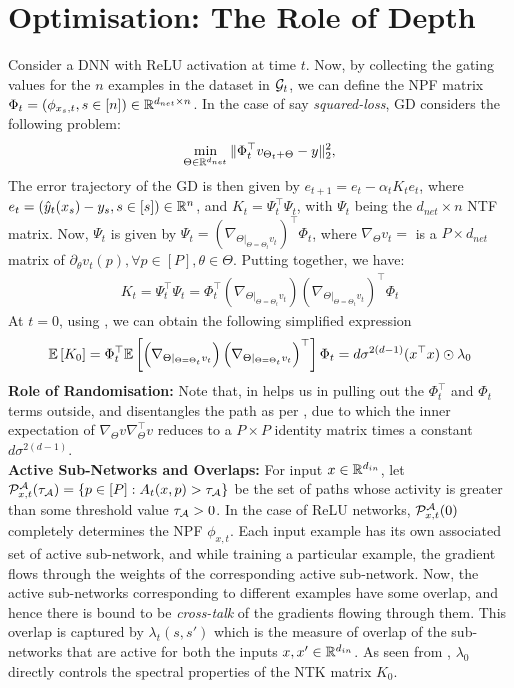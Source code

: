 \section{Optimisation: The Role of Depth}\label{sec:optimisation}
Consider a DNN with ReLU activation at time $t$. Now, by collecting the gating values for the $n$ examples in the dataset in $\mathcal{G}_t$, we can define the NPF matrix $\Phi_t=(\phi_{x_s,t},s\in[n] )\in \mathbb{R}^{d_{net}\times n}$. In the case of say \emph{squared-loss}, GD considers the following problem:
\begin{align}
\min_{\Theta\in\mathbb{R}^{d_{net}}}\|\Phi^\top_tv_{\Theta_t+\Theta}-y\|_2^2,
\end{align}
The error trajectory of the GD is then given by $e_{t+1}=e_t-\alpha_t K_te_t$, where $e_t=(\hat{y}_t(x_s)-y_s,s\in[s])\in\mathbb{R}^n$, and $K_t=\Psi^\top_t\Psi_t$, with $\Psi_t$ being the $d_{net}\times n$ NTF matrix. Now, $\Psi_t$ is given by $\Psi_t=\left(\nabla_{\Theta|_{\Theta=\Theta_t}v_t}\right)^\top\Phi_t$, where $\nabla_{\Theta}v_t=$ is a $P\times d_{net}$ matrix of $\partial_{\theta} v_t(p),\forall p\in [P], \theta\in \Theta$. Putting together, we have:
\begin{align*}
K_t=\Psi^\top_t\Psi_t=\Phi^\top_t\left(\nabla_{\Theta|_{\Theta=\Theta_t}v_t}\right)\left(\nabla_{\Theta|_{\Theta=\Theta_t}v_t}\right)^\top\Phi_t
\end{align*}
At $t=0$, using , we can obtain the following simplified expression
\begin{align}\label{eq:opti-refer}
\mathbb{E}\left[K_0\right]=\Phi^\top_t\mathbb{E}\left[\left(\nabla_{\Theta|_{\Theta=\Theta_t}v_t}\right)\left(\nabla_{\Theta|_{\Theta=\Theta_t}v_t}\right)^\top\right]\Phi_t=d\sigma^{2(d-1)}(x^\top x)\odot \lambda_0
\end{align}
\textbf{Role of Randomisation:} Note that, in  helps us in pulling out the $\Phi^\top_t$ and $\Phi_t$ terms outside, and  disentangles the path as per , due to which the inner expectation of $\nabla_{\Theta}v\nabla^\top_{\Theta}v$ reduces to a $P\times P$ identity matrix times a constant $d\sigma^{2(d-1)}$.\\
\textbf{Active Sub-Networks and Overlaps:} For input $x\in\mathbb{R}^{d_{in}}$, let $\mathcal{P}^{\mathcal{A}}_{x,t}(\tau_{\mathcal{A}})=\{p\in[P]:A_t(x,p)>\tau_{\mathcal{A}}\}$ be the set of paths whose activity is greater than some threshold value $\tau_{\mathcal{A}}>0$. In the case of ReLU networks, $\mathcal{P}^{\mathcal{A}}_{x,t}(0)$ completely determines the NPF $\phi_{x,t}$. Each input example has its own associated set of active sub-network, and while training a particular example, the gradient flows through the weights of the corresponding active sub-network. Now, the active sub-networks corresponding to different examples have some overlap, and hence there is bound to be \emph{cross-talk} of the gradients flowing through them. This overlap is captured by $\lambda_t(s,s')$ which is the measure of overlap of the sub-networks that are active for both the inputs $x,x'\in\mathbb{R}^{d_{in}}$. As seen from , $\lambda_0$ directly controls the spectral properties of the NTK matrix $K_0$.\\
